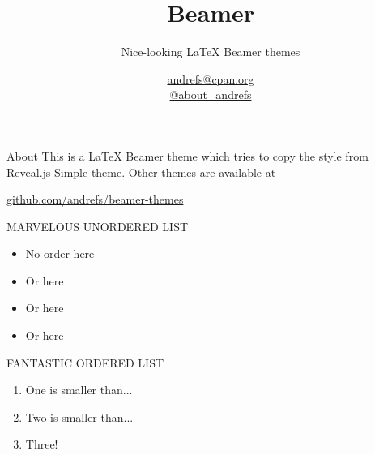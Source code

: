 \documentclass[serif,14pt,color=usenames,dvipsnames]{beamer}
\title{Beamer}
\subtitle{Nice-looking LaTeX Beamer themes}
\author{\href{mailto:andrefs@cpan.org}{andrefs@cpan.org}\\\href{http://twitter.com/about\_andrefs}{@about\_andrefs}}
\institute{Institute, Location}
\begin{document}
\begin{frame}
\maketitle
\end{frame}

\begin{frame}{About}
This is a LaTeX Beamer theme which tries to copy the style from \href{http://lab.hakim.se/reveal-js}{Reveal.js} Simple \href{http://lab.hakim.se/reveal-js/?theme=simple}{theme}. Other themes are available at
\begin{center}
\url{github.com/andrefs/beamer-themes}
\end{center}
\end{frame}

\begin{frame}{MARVELOUS UNORDERED LIST}
\begin{itemize}
\item No order here
\item Or here
\item Or here
\item Or here
\end{itemize}
\end{frame}

\begin{frame}{FANTASTIC ORDERED LIST}
\begin{enumerate}
	\item One is smaller than...
	\item Two is smaller than...
	\item Three!
\end{enumerate}
\end{frame}
\end{document}

